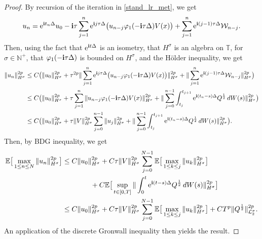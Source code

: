 \documentclass[a4paper]{amsart}
\begin{document}
\begin{proof}
    By recursion of the iteration in \eqref{stand_lr_met}, we get
    $$
    u_n={\rm e}^{{\bf i}t_n\Delta}u_0-{\bf i}\tau \displaystyle\sum_{j=1}^{n}{\rm e}^{{\bf i}j\tau\Delta}\big(u_{n-j}\varphi_1(-{\bf i}\tau\Delta)V(x)\big)
    +\displaystyle\sum_{j=1}^{n}{\rm e}^{{\bf i}(j-1)\tau\Delta}\mathcal{W}_{n-j}.
    $$
    Then, using the fact that ${\rm e}^{{\bf i}t\Delta}$ is an isometry, that $H^\sigma$ is an algebra on $\mathbb{T}$, for $\sigma\in\mathbb{N}^+$, that $\varphi_1(-{\bf i}\tau\Delta)$ is bounded on $H^\sigma$, and the Hölder inequality, we get
    \begin{align*}
    \|u_n\|_{H^\sigma}^{2p}&\le C \big(\|u_0\|_{H^\sigma}^{2p}+\tau^{2p}\|\displaystyle\sum_{j=1}^{n}{\rm e}^{{\bf i}j\tau\Delta}\big(u_{n-j}\varphi_1(-{\bf i}\tau\Delta)V(x)\big)\|_{H^\sigma}^{2p}+\|\displaystyle\sum_{j=1}^{n}{\rm e}^{{\bf i}(j-1)\tau\Delta}\mathcal{W}_{n-j}\|_{H^\sigma}^{2p}\big)\\
    &\le C\big(\|u_0\|_{H^\sigma}^{2p}+\tau \displaystyle\sum_{j=1}^{n}\|u_{n-j}\varphi_1(-{\bf i}\tau\Delta)V(x)\|^{2p}_{H^\sigma}+\|\displaystyle\sum_{j=0}^{n-1}\int_{t_j}^{t_{j+1}}{\rm e}^{{\bf i}(t_n-s)\Delta}Q^{\frac{1}{2}}\,dW(s)\|^{2p}_{H^\sigma}\big)\\
    &\le C\big(\|u_0\|_{H^\sigma}^{2p}+\tau\|V\|^{2p}_{H^\sigma} \displaystyle\sum_{j=0}^{n-1}\|u_{j}\|^{2p}_{H^\sigma}+\|\displaystyle\sum_{j=0}^{n-1}\int_{t_j}^{t_{j+1}}{\rm e}^{{\bf i}(t_n-s)\Delta}Q^{\frac{1}{2}}\,dW(s)\|^{2p}_{H^\sigma}\big).
    \end{align*}
    Then, by BDG inequality, we get
    \begin{align}
    \mathbb{E}\big[\max_{1\le n\le N}\|u_n\|^{2p}_{H^\sigma}\big]&\le C \|u_0\|_{H^\sigma}^{2p}+C\tau \|V\|^{2p}_{H^\sigma} \displaystyle\sum_{j=0}^{N-1}\mathbb{E}\big[\max_{1\le k\le j}\|u_k\|_{H^\sigma}^{2p}\big]\notag \\
    &\qquad \qquad +C\mathbb{E}\big[\displaystyle\sup_{t\in[0,T]}\|\int_0^t {\rm e}^{{\bf i}(t-s)\Delta}Q^{\frac{1}{2}}\,dW(s)\|^{2p}_{H^\sigma}\big]\notag \\
    &\le  C \|u_0\|_{H^\sigma}^{2p}+C\tau \|V\|^{2p}_{H^\sigma} \displaystyle\sum_{j=0}^{N-1}\mathbb{E}\big[\max_{1\le k\le j}\|u_k\|_{H^\sigma}^{2p}\big]+CT^p \|Q^{\frac{1}{2}}\|^{2p}_{\mathcal{L}_2^\sigma}.
    \end{align}
    An application of the discrete Gronwall inequality then yields the result.
\end{proof}
\end{document}
